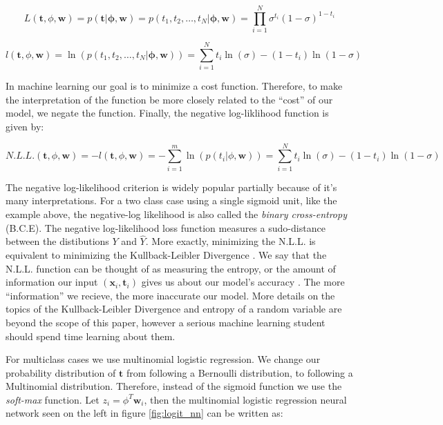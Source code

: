 \documentclass[11pt]{article}
\begin{document}
\begin{equation}\label{eq:prod_bern}
  L\left(\mathbf{t},\phi,\mathbf{w}\right) = p\left(\mathbf{t}|\mathbf{\phi},\mathbf{w}\right) = p\left(t_{1},t_{2},\ldots,t_{N}|\mathbf{\phi},\mathbf{w}\right) = \prod_{i=1}^{N}\sigma^{t_{i}}\left(1-\sigma\right)^{1-t_{i}}
\end{equation}

\begin{equation}
  l\left(\mathbf{t},\phi,\mathbf{w}\right) = \ln\left(p\left(t_{1},t_{2},\ldots,t_{N}|\mathbf{\phi},\mathbf{w}\right)\right) = \sum_{i=1}^{N}t_{i}\ln\left(\sigma\right) - \left(1-t_{i}\right)\ln\left(1-\sigma\right)
\end{equation}

In machine learning our goal is to minimize a cost function. Therefore, to make the interpretation of the function be more closely related to the ``cost'' of our model, we negate the function. Finally, the negative log-liklihood function is given by:

\begin{equation}
  N.L.L.\left(\mathbf{t},\phi,\mathbf{w}\right) = -l\left(\mathbf{t},\phi,\mathbf{w}\right) = -\sum_{i=1}^{m}\ln\left(p\left(t_{i}|\phi,\mathbf{w}\right)\right) = \sum_{i=1}^{N}t_{i}\ln\left(\sigma\right) - \left(1-t_{i}\right)\ln\left(1-\sigma\right)
\end{equation}

The negative log-likelihood criterion is widely popular partially because of it's many interpretations. For a two class case using a single sigmoid unit, like the example above, the negative-log likelihood is also called the \emph{binary cross-entropy} (B.C.E). The negative log-likelihood loss function measures a sudo-distance between the distibutions $Y$ and $\hat{Y}$. More exactly, minimizing the N.L.L. is equivalent to minimizing the Kullback-Leibler Divergence \cite{Freitas}. We say that the N.L.L. function can be thought of as measuring the entropy, or the amount of information our input $\left(\mathbf{x}_{i},\mathbf{t}_{i}\right)$ gives us about our model's accuracy \cite{Freitas}. The more ``information'' we recieve, the more inaccurate our model. More details on the topics of the Kullback-Leibler Divergence and entropy of a random variable are beyond the scope of this paper, however a serious machine learning student should spend time learning about them.


For multiclass cases we use multinomial logistic regression. We change our probability distribution of $\mathbf{t}$ from following a Bernoulli distribution, to following a Multinomial distribution. Therefore, instead of the sigmoid function we use the \emph{soft-max} function. Let $z_{i} = \phi^{T}\mathbf{w}_{i}$, then the multinomial logistic regression neural network seen on the left in figure \ref{fig:logit_nn} can be written as:
\end{document}
